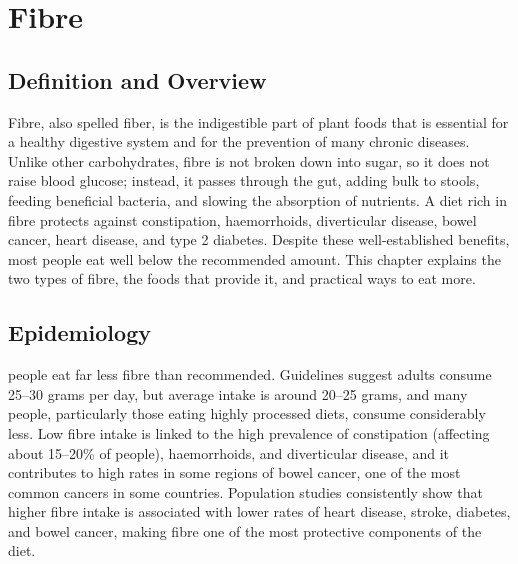 \chapter{Fibre}

\section*{Definition and Overview}
Fibre, also spelled fiber, is the indigestible part of plant foods that is essential for a healthy digestive system and for the prevention of many chronic diseases. Unlike other carbohydrates, fibre is not broken down into sugar, so it does not raise blood glucose; instead, it passes through the gut, adding bulk to stools, feeding beneficial bacteria, and slowing the absorption of nutrients. A diet rich in fibre protects against constipation, haemorrhoids, diverticular disease, bowel cancer, heart disease, and type 2 diabetes. Despite these well-established benefits, most people eat well below the recommended amount. This chapter explains the two types of fibre, the foods that provide it, and practical ways to eat more.

\section*{Epidemiology}
people eat far less fibre than recommended. Guidelines suggest adults consume 25--30 grams per day, but average intake is around 20--25 grams, and many people, particularly those eating highly processed diets, consume considerably less. Low fibre intake is linked to the high prevalence of constipation (affecting about 15--20\% of people), haemorrhoids, and diverticular disease, and it contributes to high rates in some regions of bowel cancer, one of the most common cancers in some countries. Population studies consistently show that higher fibre intake is associated with lower rates of heart disease, stroke, diabetes, and bowel cancer, making fibre one of the most protective components of the diet.

